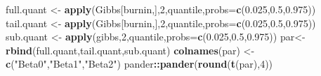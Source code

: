 \documentclass[
]{article}
\newenvironment{Shaded}{\begin{snugshade}}{\end{snugshade}}
\newcommand{\DataTypeTok}[1]{\textcolor[rgb]{0.13,0.29,0.53}{#1}}
\newcommand{\DecValTok}[1]{\textcolor[rgb]{0.00,0.00,0.81}{#1}}
\newcommand{\FloatTok}[1]{\textcolor[rgb]{0.00,0.00,0.81}{#1}}
\newcommand{\KeywordTok}[1]{\textcolor[rgb]{0.13,0.29,0.53}{\textbf{#1}}}
\newcommand{\NormalTok}[1]{#1}
\newcommand{\OperatorTok}[1]{\textcolor[rgb]{0.81,0.36,0.00}{\textbf{#1}}}
\newcommand{\StringTok}[1]{\textcolor[rgb]{0.31,0.60,0.02}{#1}}
\begin{document}
\begin{Shaded}
\begin{Highlighting}[]
\NormalTok{full.quant <-}\StringTok{ }\KeywordTok{apply}\NormalTok{(Gibbs[burnin,],}\DecValTok{2}\NormalTok{,quantile,}\DataTypeTok{probs=}\KeywordTok{c}\NormalTok{(}\FloatTok{0.025}\NormalTok{,}\FloatTok{0.5}\NormalTok{,}\FloatTok{0.975}\NormalTok{)) }
\NormalTok{tail.quant <-}\StringTok{ }\KeywordTok{apply}\NormalTok{(Gibbs[burnin,],}\DecValTok{2}\NormalTok{,quantile,}\DataTypeTok{probs=}\KeywordTok{c}\NormalTok{(}\FloatTok{0.025}\NormalTok{,}\FloatTok{0.5}\NormalTok{,}\FloatTok{0.975}\NormalTok{)) }
\NormalTok{sub.quant <-}\StringTok{ }\KeywordTok{apply}\NormalTok{(gibbs,}\DecValTok{2}\NormalTok{,quantile,}\DataTypeTok{probs=}\KeywordTok{c}\NormalTok{(}\FloatTok{0.025}\NormalTok{,}\FloatTok{0.5}\NormalTok{,}\FloatTok{0.975}\NormalTok{)) }
\NormalTok{par<-}\StringTok{ }\KeywordTok{rbind}\NormalTok{(full.quant,tail.quant,sub.quant)}
\KeywordTok{colnames}\NormalTok{(par) <-}\StringTok{ }\KeywordTok{c}\NormalTok{(}\StringTok{"Beta0"}\NormalTok{,}\StringTok{"Beta1"}\NormalTok{,}\StringTok{"Beta2"}\NormalTok{)}
\NormalTok{pander}\OperatorTok{::}\KeywordTok{pander}\NormalTok{(}\KeywordTok{round}\NormalTok{(}\KeywordTok{t}\NormalTok{(par),}\DecValTok{4}\NormalTok{))}
\end{Highlighting}
\end{Shaded}
\end{document}
